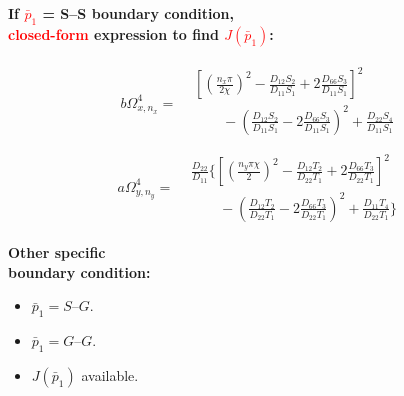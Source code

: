 \documentclass{beamer}
\begin{document}
\begin{frame}
\begin{columns}[T]
\begin{column}{0.31\textwidth}
{{\begin{minipage}{1.2\linewidth}
						\vspace{0.3cm}
						
						\begin{minipage}{0.69\linewidth}
							\hspace*{-2cm}\centering
							\textbf{If \textcolor{red}{$\bar{p}_1$} = S–S boundary condition,\\[0.em]\hspace*{-1.3cm}\textcolor{red}{closed-form} expression to find \textcolor{red}{$J(\bar{p}_1)$}:}\par\vspace{0.em}
							\begin{align*}
								b \Omega^4_{x,n_x} =
								\begin{aligned}
									&\left[\left(\frac{n_x\pi}{2\chi}\right)^2 - \frac{D_{12}S_2}{D_{11}S_1} + 2 \frac{D_{66}S_3}{D_{11}S_1}\right]^2 \\
									&\qquad- \left(\frac{D_{12}S_2}{D_{11}S_1} - 2 \frac{D_{66}S_3}{D_{11}S_1}\right)^2
									+ \frac{D_{22}S_4}{D_{11}S_1}\\
								\end{aligned}
							\end{align*}
							\begin{align*}
								a\Omega^4_{y,n_y}= 
								\begin{aligned}
									&\frac{D_{22}}{D_{11}}\Biggl\{\left[\left(\frac{n_y\pi\chi}{2}\right)^2 - \frac{D_{12}T_2}{D_{22}T_1} + 2 \frac{D_{66}T_3}{D_{22}T_1}\right]^2 \\ 
									&\qquad - \left(\frac{D_{12}T_2}{D_{22}T_1} - 2 \frac{D_{66}T_3}{D_{22}T_1}\right)^2
									+ \frac{D_{11}T_4}{D_{22}T_1}\Biggr\}
								\end{aligned}
							\end{align*}
						\end{minipage}%
						\hfill
						\begin{minipage}{0.3\linewidth}
						    \hspace*{-1.3cm}\centering
							\textbf{Other specific\\[0.3em]boundary condition:}
							\begin{itemize}
								\item $\bar{p}_1 = S–G$.
								\item $\bar{p}_1 = G–G$.
								\item $J(\bar{p}_1)$ available.
							\end{itemize}
						\end{minipage}
						

\end{minipage}}}
\end{column}
\end{columns}
\end{frame}
\end{document}
